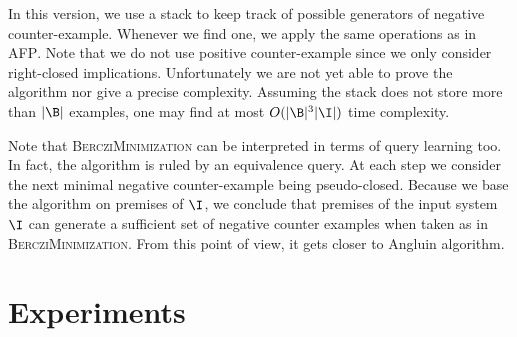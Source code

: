 \documentclass[a4paper, 10pt]{article}
\begin{document}
In this version, we use a stack to keep track of possible generators of negative counter-example. Whenever we find one, we apply the same operations as in \textsc{AFP}. Note that we do not use positive counter-example since we only
consider right-closed implications. Unfortunately we are not yet able to prove the algorithm nor give a precise complexity. Assuming the stack does not store more than $|\B|$ examples, one may find at most $O(|\B|^3|\I|)$ time complexity.

Note that \textsc{BercziMinimization} can be interpreted in terms of query learning too. In fact, the algorithm is ruled by an equivalence query. At each step we consider the next minimal negative counter-example being pseudo-closed. Because we base the algorithm on premises of $\I$, we conclude that premises of
the input system $\I$ can generate a sufficient set of negative counter examples when taken as in \textsc{BercziMinimization}. From this point of view, it gets closer to Angluin algorithm.

\section{Experiments}



\end{document}
